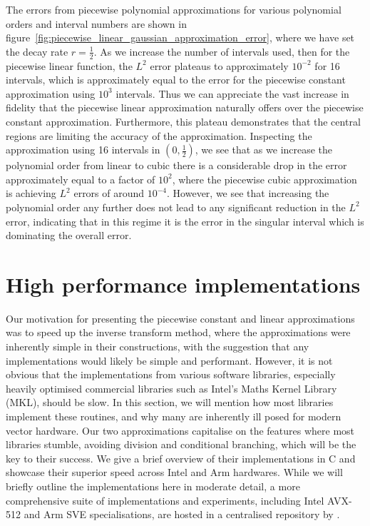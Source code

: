 \documentclass[manuscript,review]{acmart}
\begin{document}
The errors from piecewise polynomial approximations for various polynomial orders and interval numbers are shown in figure~\ref{fig:piecewise_linear_gaussian_approximation_error}, where we have set the decay rate $ r = \tfrac{1}{2} $. As we increase the number of intervals used, then for the piecewise linear function, the $ L^2 $ error plateaus to approximately $ 10^{-2} $ for 16 intervals, which is approximately equal to the error for the piecewise constant approximation using $ 10^3 $ intervals. Thus we can appreciate the vast increase in fidelity that the piecewise linear approximation naturally offers over the piecewise constant approximation. Furthermore, this plateau demonstrates that the central regions are limiting the accuracy of the approximation. Inspecting the approximation using 16 intervals in $ (0, \tfrac{1}{2}) $, we see that as we increase the polynomial order from linear to cubic there is a considerable drop in the error approximately equal to a factor of $ 10^2 $, where the piecewise cubic approximation is achieving $ L^2 $ errors of around $ 10^{-4} $. However, we see that increasing the polynomial order any further does not lead to any significant reduction in the $ L^2 $ error, indicating that in this regime it is the error in the singular interval which is dominating the overall error. 

\section{High performance implementations}
\label{sec:high_performance_impementations}

Our motivation for presenting the piecewise constant and linear approximations was to speed up the inverse transform method, where the approximations were inherently simple in their constructions, with the suggestion that any implementations would likely be simple and performant. However, it is not obvious that the implementations from various software libraries, especially heavily optimised commercial libraries such as Intel's Maths Kernel Library (MKL), should be slow. In this section, we will mention how most libraries implement these routines, and why many are inherently ill posed for modern vector hardware. Our two approximations capitalise on the features where most libraries stumble, avoiding division and conditional branching, which will be the key to their success. We give a brief overview of their implementations in C and showcase their superior speed across Intel and Arm hardwares. While we will briefly outline the implementations here in moderate detail, a more comprehensive suite of implementations and experiments, including Intel AVX-512 and Arm SVE specialisations, are hosted in a centralised repository by \citet{sheridan2020approximate_random}.
\end{document}
